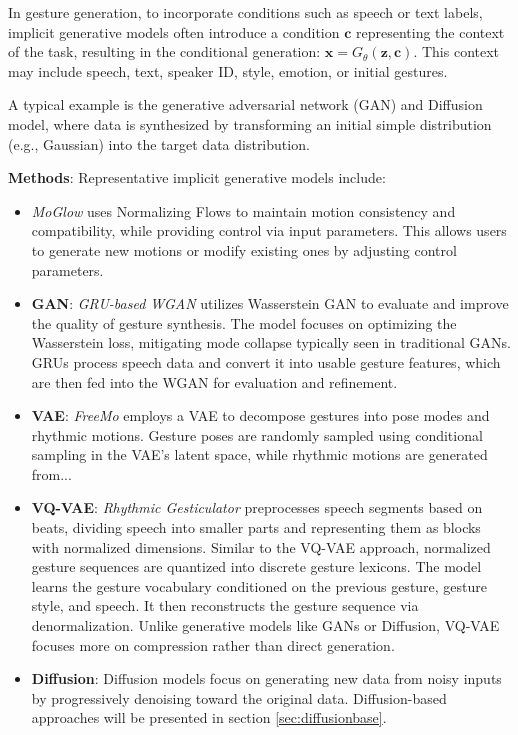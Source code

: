 In gesture generation, to incorporate conditions such as speech or text labels, implicit generative models often introduce a condition $\mathbf{c}$ representing the context of the task, resulting in the conditional generation: $\mathbf{x} = G_\theta(\mathbf{z}, \mathbf{c})$. This context may include speech, text, speaker ID, style, emotion, or initial gestures.

A typical example is the generative adversarial network (GAN) and Diffusion model, where data is synthesized by transforming an initial simple distribution (e.g., Gaussian) into the target data distribution.

\textbf{Methods}: Representative implicit generative models include:

\begin{itemize}
	\item \textit{MoGlow} \cite{henter2020moglow} uses Normalizing Flows to maintain motion consistency and compatibility, while providing control via input parameters. This allows users to generate new motions or modify existing ones by adjusting control parameters.
	
	\item \textbf{GAN}: \textit{GRU-based WGAN} \cite{wu2021probabilistic} utilizes Wasserstein GAN to evaluate and improve the quality of gesture synthesis. The model focuses on optimizing the Wasserstein loss, mitigating mode collapse typically seen in traditional GANs. GRUs process speech data and convert it into usable gesture features, which are then fed into the WGAN for evaluation and refinement.
	
	\item \textbf{VAE}: \textit{FreeMo} \cite{xu2022freeform} employs a VAE to decompose gestures into pose modes and rhythmic motions. Gesture poses are randomly sampled using conditional sampling in the VAE's latent space, while rhythmic motions are generated from...
	
	\item \textbf{VQ-VAE}: \textit{Rhythmic Gesticulator} \cite{ao2022rhythmic} preprocesses speech segments based on beats, dividing speech into smaller parts and representing them as blocks with normalized dimensions. Similar to the VQ-VAE approach, normalized gesture sequences are quantized into discrete gesture lexicons. The model learns the gesture vocabulary conditioned on the previous gesture, gesture style, and speech. It then reconstructs the gesture sequence via denormalization. Unlike generative models like GANs or Diffusion, VQ-VAE focuses more on compression rather than direct generation.
	
	\item \textbf{Diffusion}: Diffusion models focus on generating new data from noisy inputs by progressively denoising toward the original data. Diffusion-based approaches will be presented in section \autoref{sec:diffusionbase}.
\end{itemize}



